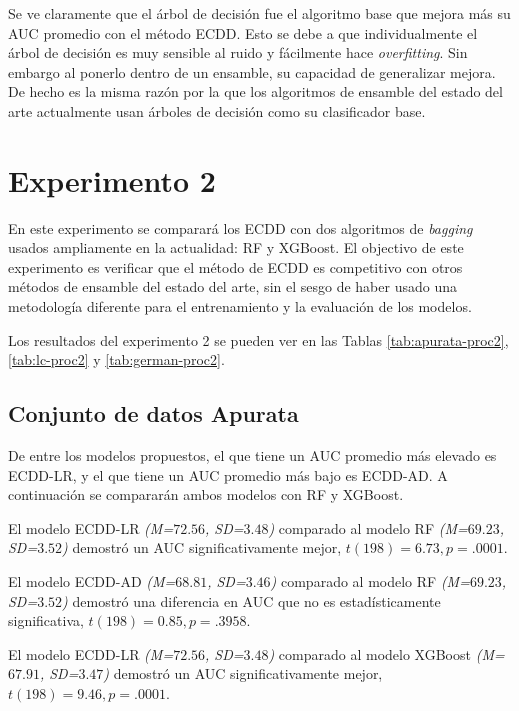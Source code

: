 Se ve claramente que el árbol de decisión fue el algoritmo base que mejora más su \ac{AUC} promedio con el método \ac{ECDD}. Esto se debe a que individualmente el árbol de decisión es muy sensible al ruido y fácilmente hace \textit{overfitting}. Sin embargo al ponerlo dentro de un ensamble, su capacidad de generalizar mejora. De hecho es la misma razón por la que los algoritmos de ensamble del estado del arte actualmente usan árboles de decisión como su clasificador base.




\section{Experimento 2} %

En este experimento se comparará los \ac{ECDD} con dos algoritmos de \textit{bagging} usados ampliamente en la actualidad: \ac{RF} y \ac{XGBoost}. El objectivo de este experimento es verificar que el método de \ac{ECDD} es competitivo con otros métodos de ensamble del estado del arte, sin el sesgo de haber usado una metodología diferente para el entrenamiento y la evaluación de los modelos.

Los resultados del experimento 2 se pueden ver en las Tablas \ref{tab:apurata-proc2}, \ref{tab:lc-proc2} y \ref{tab:german-proc2}.

\subsection{Conjunto de datos Apurata}

De entre los modelos propuestos, el que tiene un \ac{AUC} promedio más elevado es ECDD-LR, y el que tiene un \ac{AUC} promedio más bajo es ECDD-AD. A continuación se compararán ambos modelos con \ac{RF} y \ac{XGBoost}.

El modelo ECDD-LR \textit{(M=$72.56$, SD=$3.48$)} comparado al modelo \ac{RF} \textit{(M=$69.23$, SD=$3.52$)} demostró un \ac{AUC} significativamente mejor, $t(198)=6.73, p=.0001$.

El modelo ECDD-AD  \textit{(M=$68.81$, SD=$3.46$)} comparado al modelo \ac{RF} \textit{(M=$69.23$, SD=$3.52$)} demostró una diferencia en \ac{AUC} que no es estadísticamente significativa, $t(198)=0.85, p=.3958$.

El modelo ECDD-LR \textit{(M=$72.56$, SD=$3.48$)} comparado al modelo \ac{XGBoost} \textit{(M=$67.91$, SD=$3.47$)} demostró un \ac{AUC} significativamente mejor, $t(198)=9.46, p=.0001$.

